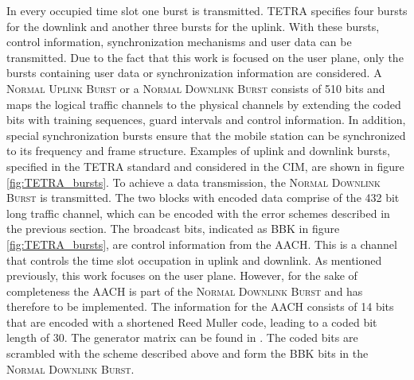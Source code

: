 In every occupied time slot one burst is transmitted. TETRA specifies four bursts for the downlink and another three bursts for the uplink. With these bursts, control information, synchronization mechanisms and user data can be transmitted. Due to the fact that this work is focused on the user plane, only the bursts containing user data or synchronization information are considered. A \textsc{Normal Uplink Burst} or a \textsc{Normal Downlink Burst} consists of 510 bits and maps the logical traffic channels to the physical channels by extending the coded bits with training sequences, guard intervals and control information. In addition, special synchronization bursts ensure that the mobile station can be synchronized to its frequency and frame structure. Examples of uplink and downlink bursts, specified in the TETRA standard and considered in the \ac{CIM}, are shown in figure \ref{fig:TETRA_bursts}. To achieve a data transmission, the \textsc{Normal Downlink Burst} is transmitted. The two blocks with encoded data comprise of the 432 bit long traffic channel, which can be encoded with the error schemes described in the previous section. The broadcast bits, indicated as BBK in figure \ref{fig:TETRA_bursts}, are control information from the \ac{AACH}. This is a channel that controls the time slot occupation in uplink and downlink. As mentioned previously, this work focuses on the user plane. However, for the sake of completeness the \ac{AACH} is part of the \textsc{Normal Downlink Burst} and has therefore to be implemented. The information for the \ac{AACH} consists of 14 bits that are encoded with a shortened Reed Muller code, leading to a coded bit length of 30. The generator matrix can be found in \cite{ETSI07}. The coded bits are scrambled with the scheme described above and form the BBK bits in the \textsc{Normal Downlink Burst}.


